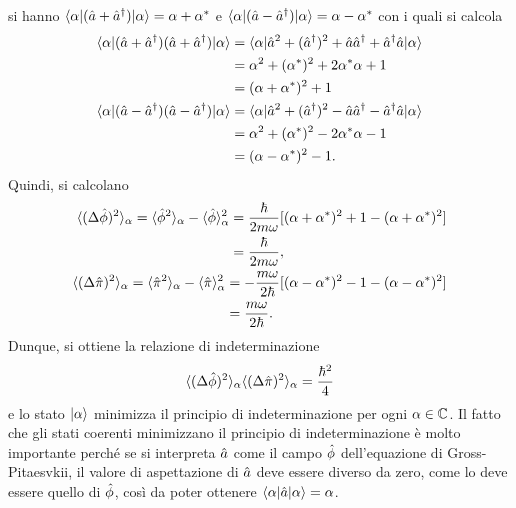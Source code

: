si hanno $\langle \alpha | (\hat{a} + \hat{a}^\dagger) | \alpha \rangle = \alpha + \alpha^*$ e $\langle \alpha | (\hat{a} - \hat{a}^\dagger) | \alpha \rangle = \alpha - \alpha^*$ con i quali si calcola
\begin{align}
    \begin{split}
        \langle \alpha | (\hat{a} + \hat{a}^\dagger)(\hat{a} + \hat{a}^\dagger) | \alpha \rangle &= \langle \alpha | \hat{a}^2 + (\hat{a}^\dagger)^2 + \hat{a}\hat{a}^\dagger + \hat{a}^\dagger\hat{a} | \alpha \rangle \\
        &= \alpha^2 + (\alpha^*)^2 + 2\alpha^*\alpha + 1 \\
        &= (\alpha + \alpha^*)^2 + 1
    \end{split} \\
    \begin{split}
        \langle \alpha | (\hat{a} - \hat{a}^\dagger)(\hat{a} - \hat{a}^\dagger) | \alpha \rangle &= \langle \alpha | \hat{a}^2 + (\hat{a}^\dagger)^2 - \hat{a}\hat{a}^\dagger - \hat{a}^\dagger\hat{a} | \alpha \rangle \\
        &= \alpha^2 + (\alpha^*)^2 - 2\alpha^*\alpha - 1 \\
        &= (\alpha - \alpha^*)^2 - 1.
    \end{split}
\end{align}
Quindi, si calcolano
\begin{align}
    \begin{split}
        \langle (\Delta\hat{\phi})^2 \rangle_\alpha = \langle \hat{\phi}^2 \rangle_\alpha - \langle \hat{\phi} \rangle_\alpha^2 &= \frac{\hbar}{2m\omega}[(\alpha + \alpha^*)^2 + 1 - (\alpha + \alpha^*)^2] \\
        &= \frac{\hbar}{2m\omega},
    \end{split} \\
    \begin{split}
        \langle (\Delta\hat{\pi})^2 \rangle_\alpha = \langle \hat{\pi}^2 \rangle_\alpha - \langle \hat{\pi} \rangle_\alpha^2 &= -\frac{m\omega}{2\hbar}[(\alpha - \alpha^*)^2 - 1 - (\alpha - \alpha^*)^2] \\
        &= \frac{m\omega}{2\hbar}.
    \end{split}
\end{align}
Dunque, si ottiene la relazione di indeterminazione
\begin{equation}
\label{eq: principio di indeterminazione}
    \langle (\Delta\hat{\phi})^2 \rangle_\alpha\langle (\Delta\hat{\pi})^2 \rangle_\alpha = \frac{\hbar^2}{4}
\end{equation}
e lo stato $\ket{\alpha}$ minimizza il principio di indeterminazione per ogni $\alpha \in \mathbb{C}$. Il fatto che gli stati coerenti minimizzano il principio di indeterminazione è molto importante perché se si interpreta $\hat{a}$ come il campo $\hat{\phi}$ dell'equazione di Gross-Pitaesvkii, il valore di aspettazione di $\hat{a}$ deve essere diverso da zero, come lo deve essere quello di $\hat{\phi}$, così da poter ottenere $\langle \alpha | \hat{a} | \alpha \rangle = \alpha$.
